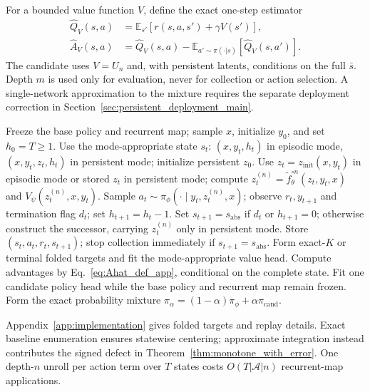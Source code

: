 \documentclass{article}
\theoremstyle{plain}
\theoremstyle{definition}
\theoremstyle{remark}
\newcommand{\E}{\mathbb{E}}
\begin{document}
For a bounded value function $V$, define the exact one-step estimator
\begin{align}
\widehat Q_V(s,a) &= \E_{s'}[r(s,a,s') + \gamma V(s')], \\
\widehat A_V(s,a) &= \widehat Q_V(s,a) -
\E_{a'\sim\pi(\cdot|s)}[\widehat Q_V(s,a')].
\label{eq:Ahat_def_app}
\end{align}
The candidate uses $V=U_n$ and, with persistent latents, conditions on the full
$\bar s$. Depth $m$ is used only for evaluation, never for collection or action
selection. A single-network approximation to the mixture requires the separate
deployment correction in Section~\ref{sec:persistent_deployment_main}.

\begin{algorithm}[t]
\small
\caption{One fixed-base UPI-TRM proposal on the clock-complete edit MDP}
\label{alg:upi}
\begin{algorithmic}[1]
\STATE Freeze the base policy and recurrent map; sample $x$, initialize $y_0$, and set $h_0=T\ge1$.
\STATE Use the mode-appropriate state $s_t$: $(x,y_t,h_t)$ in episodic mode, $(x,y_t,z_t,h_t)$ in persistent mode; initialize persistent $z_0$.
  \STATE Use $z_t=z_{\mathrm{init}}(x,y_t)$ in episodic mode or stored $z_t$ in persistent mode; compute $z_t^{(n)}=\widetilde f_\theta^{\circ n}(z_t,y_t,x)$ and $V_\psi(z_t^{(n)},x,y_t)$.
  \STATE Sample $a_t\sim\pi_\phi(\cdot\mid y_t,z_t^{(n)},x)$;
  observe $r_t,y_{t+1}$ and termination flag $d_t$;
  set $h_{t+1}=h_t-1$.
  \STATE Set $s_{t+1}=s_{\mathrm{abs}}$ if $d_t$ or $h_{t+1}=0$; otherwise construct the successor, carrying $z_t^{(n)}$ only in persistent mode.
  \STATE Store $(s_t,a_t,r_t,s_{t+1})$; stop collection immediately if $s_{t+1}=s_{\mathrm{abs}}$.
\ENDFOR
\STATE Form exact-$K$ or terminal folded targets and fit the mode-appropriate value head.
\STATE Compute advantages by Eq.~\eqref{eq:Ahat_def_app}, conditional on the complete state.
\STATE Fit one candidate policy head while the base policy and recurrent map remain frozen.
\STATE Form the exact probability mixture $\pi_\alpha=(1-\alpha)\pi_\phi+\alpha\pi_{\mathrm{cand}}$.
\end{algorithmic}
\end{algorithm}

Appendix~\ref{app:implementation} gives folded targets and replay details.
Exact baseline enumeration ensures
statewise centering; approximate integration instead contributes the signed
defect in Theorem~\ref{thm:monotone_with_error}.
One depth-$n$ unroll per action term over $T$ states costs
$O(T|\mathcal A|n)$ recurrent-map applications.
\end{document}
